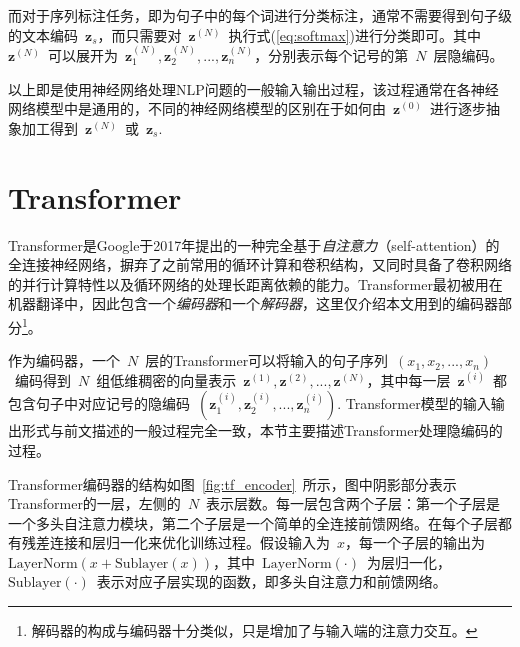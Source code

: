 而对于序列标注任务，即为句子中的每个词进行分类标注，通常不需要得到句子级的文本编码~$\mathbf{z}_s$，而只需要对~$\mathbf{z}^{(N)}$~执行式(\ref{eq:softmax})进行分类即可。其中~$\mathbf{z}^{(N)}$~可以展开为~$\mathbf{z}^{(N)}_1, \mathbf{z}^{(N)}_2, ..., \mathbf{z}^{(N)}_n$，分别表示每个记号的第~$N$~层隐编码。

以上即是使用神经网络处理NLP问题的一般输入输出过程，该过程通常在各神经网络模型中是通用的，不同的神经网络模型的区别在于如何由~$\mathbf{z}^{(0)}$~进行逐步抽象加工得到~$\mathbf{z}^{(N)}$~或~$\mathbf{z}_s$. 

\section{Transformer}
\label{sec:tf}
Transformer是Google于2017年提出的一种完全基于\emph{自注意力}（self-attention）的全连接神经网络\cite{DBLP:conf/nips/VaswaniSPUJGKP17}，摒弃了之前常用的循环计算和卷积结构，又同时具备了卷积网络的并行计算特性以及循环网络的处理长距离依赖的能力。Transformer最初被用在机器翻译中，因此包含一个\emph{编码器}和一个\emph{解码器}，这里仅介绍本文用到的编码器部分\footnote{解码器的构成与编码器十分类似，只是增加了与输入端的注意力交互。}。

作为编码器，一个~$N$~层的Transformer可以将输入的句子序列~$(x_1, x_2, ..., x_n)$~编码得到~$N$~组低维稠密的向量表示~$\mathbf{z}^{(1)}, \mathbf{z}^{(2)}, ..., \mathbf{z}^{(N)}$，其中每一层~$\mathbf{z}^{(i)}$~都包含句子中对应记号的隐编码~$(\mathbf{z}^{(i)}_1, \mathbf{z}^{(i)}_2, ..., \mathbf{z}^{(i)}_n)$. Transformer模型的输入输出形式与前文描述的一般过程完全一致，本节主要描述Transformer处理隐编码的过程。

Transformer编码器的结构如图~\ref{fig:tf_encoder}~所示，图中阴影部分表示Transformer的一层，左侧的~$N$~表示层数。每一层包含两个子层：第一个子层是一个多头自注意力模块，第二个子层是一个简单的全连接前馈网络。在每个子层都有残差连接\cite{DBLP:conf/cvpr/HeZRS16}和层归一化\cite{lei2016layer}来优化训练过程。假设输入为~$x$，每一个子层的输出为~$\mathrm{LayerNorm}(x+\mathrm{Sublayer}(x))$，其中~$\mathrm{LayerNorm}(\cdot)$~为层归一化，$\mathrm{Sublayer}(\cdot)$~表示对应子层实现的函数，即多头自注意力和前馈网络。

